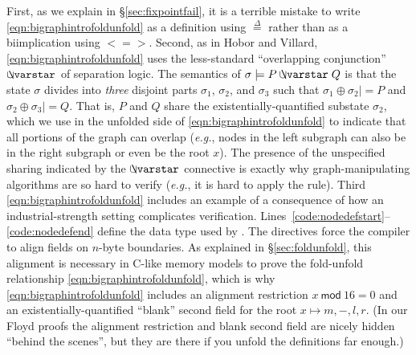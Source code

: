 First, as we explain in \S\ref{sec:fixpointfail}, it is a terrible mistake to write \eqref{eqn:bigraphintrofoldunfold} as a definition using $\stackrel{\Delta}{=}$ rather than as a biimplication using $<=>$.  Second, as in Hobor and Villard, \eqref{eqn:bigraphintrofoldunfold} uses the less-standard ``overlapping conjunction'' $\ocon$ of separation logic.  The semantics of $\sigma |= P \ocon Q$ is that the state $\sigma$ divides into \emph{three} disjoint parts $\sigma_1$, $\sigma_2$, and $\sigma_3$ such that $\sigma_1 \oplus \sigma_2 |= P$ and $\sigma_2 \oplus \sigma_3 |= Q$.  That is, $P$ and $Q$ share the existentially-quantified substate $\sigma_2$, which we use in the unfolded side of \eqref{eqn:bigraphintrofoldunfold} to indicate that all portions of the graph can overlap (\emph{e.g.}, nodes in the left subgraph can also be in the right subgraph or even be the root $x$).  The presence of the unspecified sharing indicated by the $\ocon$ connective is exactly why graph-manipulating algorithms are so hard to verify (\emph{e.g.}, it is hard to apply the  rule).  Third \eqref{eqn:bigraphintrofoldunfold} includes an example of a consequence of how an industrial-strength setting complicates verification.  Lines~\ref{code:nodedefstart}--\ref{code:nodedefend} define the data type  used by .  The  directives force the compiler to align fields on $n$-byte boundaries.  As explained in \S\ref{sec:foldunfold}, this alignment is necessary in C-like memory models to prove the fold-unfold relationship \eqref{eqn:bigraphintrofoldunfold}, which is why \eqref{eqn:bigraphintrofoldunfold} includes an alignment restriction $x~\mathsf{mod}~16 = 0$ and an existentially-quantified ``blank'' second field for the root $x \mapsto m,-,l,r$.  (In our Floyd proofs the alignment restriction and blank second field are nicely hidden ``behind the scenes'', but they are there if you unfold the definitions far enough.)

